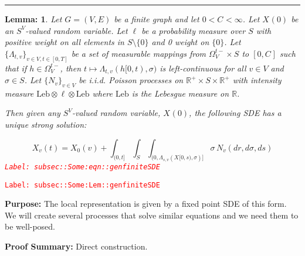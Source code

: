 \documentclass[12pt]{article}
\newcommand{\mb}{\mathbb}
\newcommand{\te}{\text}
\newcommand{\tr}{\textcolor{red}}
\newcommand{\labe}[1]{\tr{\texttt{Label: #1}}}
\newcommand{\purpose}{\textbf{Purpose: }}
\newcommand{\pfsum}{\textbf{Proof Summary: }}
\newcommand{\ind}{\hspace{24pt}}
\newcommand{\lin}{\rule{\linewidth}{0.4 pt}}
\renewcommand{\v}{v}							%
\renewcommand{\S}{S}							%
\newcommand{\s}{\sigma}							%
\newcommand{\T}{T}								%
\newcommand{\OmegaV}[2]{\Omega_{#1}^{#2}}		%
\renewcommand{\t}{t}							%
\newcommand{\poiss}[1]{N_{#1}}						%
\newcommand{\leb}{\te{Leb}}							%
\renewcommand{\G}{G}								%
\newcommand{\V}{V}									%
\newcommand{\E}{E}									%
\renewcommand{\tt}{s}								%
\renewcommand{\r}{r}								%
\newcommand{\rxvt}[2]{X_{#1}{(#2)}}					%
\newcommand{\rxvts}[2]{X_{#1}{#2}}					%
\newcommand{\ratee}[1]{\Lambda_{#1}}				%
\newcommand{\const}[1]{C_{#1}}						%
\newcommand{\Sm}{\ell}								%
\newtheorem{lem}[thms]{Lemma: }
\begin{document}
\lin

\begin{lem}
Let \(\G = (\V,\E)\) be a finite graph and let \(0 < \const{}< \infty\). Let \(\rxvt{}{0}\) be an \(\S^\V\)-valued random variable. Let \(\Sm\) be a probability measure over \(\S\) with positive weight on all elements in \(S\setminus\{0\}\) and 0 weight on \(\{0\}\). Let \(\{\ratee{\t,\v}\}_{\v \in \V,\t\in [0,\T]}\) be a set of measurable mappings from \(\OmegaV{\V}{\t-} \times \S\) to \([0,\const{}]\) such that if \(h \in \OmegaV{\V}{\t-}\), then \(\t\mapsto \ratee{\t,\v}(h[0,\t),\s)\) is left-continuous for all \(\v \in \V\) and \(\s \in \S\). Let \(\{\poiss{\v}\}_{\v \in \V}\) be i.i.d. Poisson processes on \(\mb{R}^+\times \S\times\mb{R}^+\) with intensity measure \(\leb\otimes\Sm\otimes\leb\) where \(\leb\) is the Lebesgue measure on \(\mb{R}\).

\ind Then given any \(\S^\V\)-valued random variable, \(\rxvt{}{0}\), the following SDE has a unique strong solution:

\begin{equation}
\rxvt{\v}{\t} = \rxvt{0}{\v} + \int_{(0,\t]}\int_\S\int_{(0,\ratee{\tt,\v}(\rxvts{}{[0,\tt)},\s)]}  \s\,\poiss{\v}(d\r,d\s,d\tt)
\label{subsec::Some:eqn::genfiniteSDE}
\end{equation}
\labe{subsec::Some:eqn::genfiniteSDE}
\label{subsec::Some:Lem::genfiniteSDE}
\end{lem}
\labe{subsec::Some:Lem::genfiniteSDE}

\purpose The local representation is given by a fixed point SDE of this form. We will create several processes that solve similar equations and we need them to be well-posed.

\pfsum Direct construction.
\end{document}
